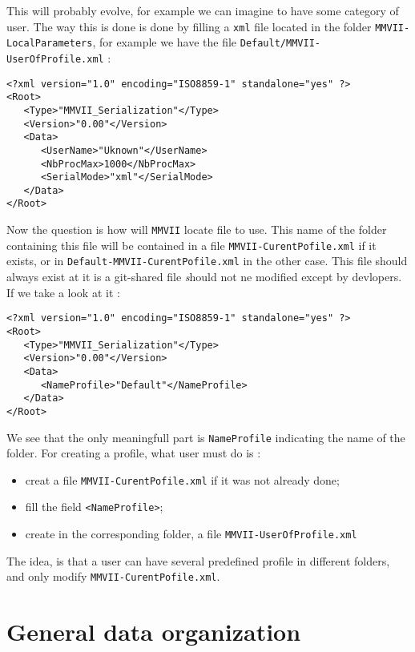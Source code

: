 This will probably evolve, for example we can imagine to have some category of user.
The way this is done is done by filling a {\tt xml} file located in the folder 
{\tt MMVII-LocalParameters}, for example we have the file {\tt Default/MMVII-UserOfProfile.xml} :

\begin{verbatim}
<?xml version="1.0" encoding="ISO8859-1" standalone="yes" ?>
<Root>
   <Type>"MMVII_Serialization"</Type>
   <Version>"0.00"</Version>
   <Data>
      <UserName>"Uknown"</UserName>
      <NbProcMax>1000</NbProcMax>
      <SerialMode>"xml"</SerialMode>
   </Data>
</Root>
\end{verbatim}

Now the question is how will {\tt MMVII} locate file to use. This name of the folder containing
this file will be contained in a file {\tt MMVII-CurentPofile.xml} if it exists,
or in {\tt Default-MMVII-CurentPofile.xml} in the other case. This file should always exist
at it is a git-shared file {\emph should not ne modified except by devlopers}.
If we take a look at  it : 

\begin{verbatim}
<?xml version="1.0" encoding="ISO8859-1" standalone="yes" ?>
<Root>
   <Type>"MMVII_Serialization"</Type>
   <Version>"0.00"</Version>
   <Data>
      <NameProfile>"Default"</NameProfile>
   </Data>
</Root>
\end{verbatim}

We see that the only meaningfull part is {\tt NameProfile} indicating the name
of the folder. For creating a profile, what user must do is :

\begin{itemize}
    \item creat a file  {\tt MMVII-CurentPofile.xml} if it was not already done;
    \item fill the field {\tt <NameProfile>};
    \item create in the corresponding folder, a file {\tt MMVII-UserOfProfile.xml}
\end{itemize}

The idea, is that a user can have several predefined profile in different folders,
and only modify  {\tt MMVII-CurentPofile.xml}.



\section{General data organization}

